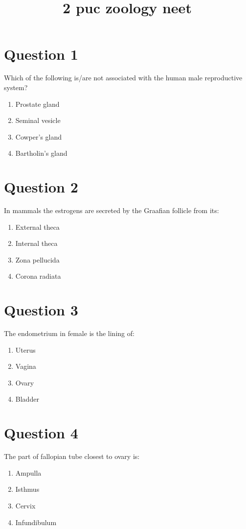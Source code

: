 \documentclass{article}
\title{2 puc zoology neet}
\begin{document}
                    \maketitle
                    \section*{Question 1}
Which of the following is/are not associated with the human male reproductive system?
\begin{enumerate}[label=(\alph*)]
\item Prostate gland
\item Seminal vesicle
\item Cowper's gland
\item Bartholin's gland
\end{enumerate}
\newpage
\section*{Question 2}
In mammals the estrogens are secreted by the Graafian follicle from its:
\begin{enumerate}[label=(\alph*)]
\item External theca
\item Internal theca
\item Zona pellucida
\item Corona radiata
\end{enumerate}
\newpage
\section*{Question 3}
The endometrium in female is the lining of:
\begin{enumerate}[label=(\alph*)]
\item Uterus
\item Vagina
\item Ovary
\item Bladder
\end{enumerate}
\newpage
\section*{Question 4}
The part of fallopian tube closest to ovary is:
\begin{enumerate}[label=(\alph*)]
\item Ampulla
\item Isthmus
\item Cervix
\item Infundibulum
\end{enumerate}
\newpage
\end{document}
